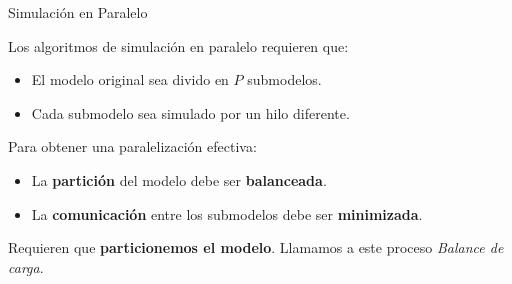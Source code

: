 








\begin{frame}{Simulación en Paralelo}

Los algoritmos de simulación en paralelo requieren que:


\begin{itemize}
    \item El modelo original sea divido en $P$ submodelos.

    \item Cada submodelo sea simulado por un hilo diferente.

\end{itemize}

\pause

Para obtener una paralelización efectiva:

\begin{itemize}
    \item La \textbf{partición} del modelo debe ser \textbf{balanceada}.

    \item La \textbf{comunicación} entre los submodelos debe ser \textbf{minimizada}.

\end{itemize}

\pause
Requieren que \textbf{particionemos el modelo}. \pause
Llamamos a este proceso \textit{Balance de carga}.

\end{frame}


